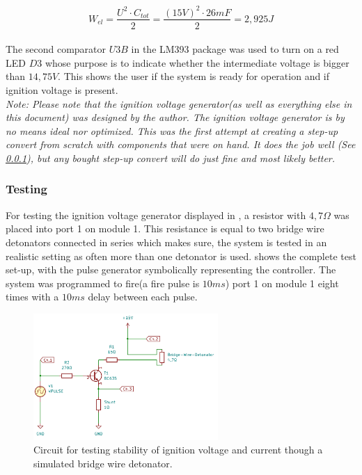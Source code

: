 \begin{equation}
W_{el}=\frac{U^2 \cdot C_{tot}}{2}=\frac{(15V)^2 \cdot 26mF}{2}=2,925J
\label{eq:power_in_system}
\end{equation}\\

\noindent The second comparator $U3B$ in the LM393 package was used to turn on a red LED $D3$ whose purpose is to indicate whether the intermediate voltage is bigger than $14,75V$. This shows the user if the system is ready for operation and if ignition voltage is present.\\


\noindent \small{\textit{Note: Please note that the ignition voltage generator(as well as everything else in this document) was designed by the author. The ignition voltage generator is by no means ideal nor optimized. This was the first attempt at creating a step-up convert from scratch with components that were on hand. It does the job well (See \cref{Testing}), but any bought step-up convert will do just fine and most likely better.}}\\

\pagebreak

\subsubsection{Testing}
\label{Testing}
For testing the ignition voltage generator displayed in , a resistor with $4,7\Omega$ was placed into port 1 on module 1. This resistance is equal to two bridge wire detonators connected in series which makes sure, the system is tested in an realistic setting as often more than one detonator is used.  shows the complete test set-up, with the pulse generator symbolically representing the controller. The system was programmed to fire(a fire pulse is $10ms$) port 1 on module 1 eight times with a $10ms$ delay between each pulse.

\begin{figure}[!ht]
    \centering
    \includegraphics[width=7cm]{./Figures/testrig_pulse.png}
    \caption{Circuit for testing stability of ignition voltage and current though a simulated bridge wire detonator.}
    \label{fig:testrig_pulse}     
\end{figure}

